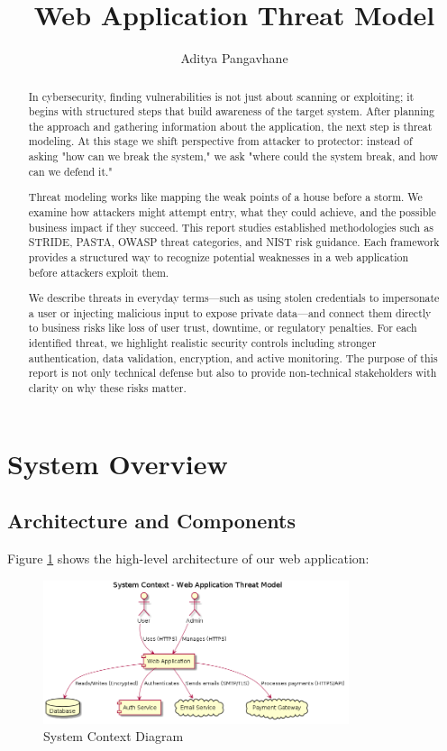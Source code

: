 \documentclass{article}
\title{Web Application Threat Model}
\author{Aditya Pangavhane}
\begin{document}
\maketitle

\begin{abstract}
In cybersecurity, finding vulnerabilities is not just about scanning or exploiting; it begins with structured steps that build awareness of the target system. After planning the approach and gathering information about the application, the next step is threat modeling. At this stage we shift perspective from attacker to protector: instead of asking "how can we break the system," we ask "where could the system break, and how can we defend it."

Threat modeling works like mapping the weak points of a house before a storm. We examine how attackers might attempt entry, what they could achieve, and the possible business impact if they succeed. This report studies established methodologies such as STRIDE, PASTA, OWASP threat categories, and NIST risk guidance. Each framework provides a structured way to recognize potential weaknesses in a web application before attackers exploit them.

We describe threats in everyday terms—such as using stolen credentials to impersonate a user or injecting malicious input to expose private data—and connect them directly to business risks like loss of user trust, downtime, or regulatory penalties. For each identified threat, we highlight realistic security controls including stronger authentication, data validation, encryption, and active monitoring. The purpose of this report is not only technical defense but also to provide non-technical stakeholders with clarity on why these risks matter.
\end{abstract}

\section{System Overview}
\subsection{Architecture and Components}

Figure \ref{fig:system-context} shows the high-level architecture of our web application:

\begin{figure}[H]
    \centering
    \includegraphics[width=0.8\textwidth]{images/system-context}
    \caption{System Context Diagram}
    \label{fig:system-context}
\end{figure}
\end{document}
